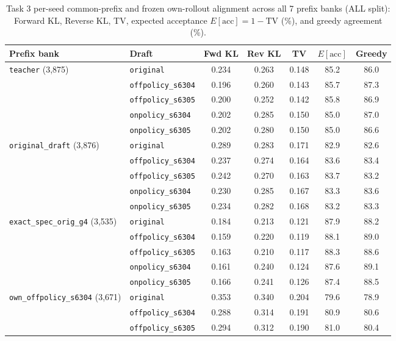 \documentclass{article}
\begin{document}
\begin{table}[H]
\centering\footnotesize
\caption{Task 3 per-seed common-prefix and frozen own-rollout alignment across all 7 prefix banks (ALL split): Forward KL, Reverse KL, TV, expected acceptance $E[\text{acc}]=1-\text{TV}$ (\%), and greedy agreement (\%).}
\label{tab:t3align}
\begin{tabular}{llccccc}
\toprule
Prefix bank & Draft & Fwd KL & Rev KL & TV & $E[\text{acc}]$ & Greedy \\
\midrule
\texttt{teacher} (3,875) & \texttt{original} & 0.234 & 0.263 & 0.148 & 85.2 & 86.0 \\
 & \texttt{offpolicy\_s6304} & 0.196 & 0.260 & 0.143 & 85.7 & 87.3 \\
 & \texttt{offpolicy\_s6305} & 0.200 & 0.252 & 0.142 & 85.8 & 86.9 \\
 & \texttt{onpolicy\_s6304} & 0.202 & 0.285 & 0.150 & 85.0 & 87.0 \\
 & \texttt{onpolicy\_s6305} & 0.202 & 0.280 & 0.150 & 85.0 & 86.6 \\
\midrule
\texttt{original\_draft} (3,876) & \texttt{original} & 0.289 & 0.283 & 0.171 & 82.9 & 82.6 \\
 & \texttt{offpolicy\_s6304} & 0.237 & 0.274 & 0.164 & 83.6 & 83.4 \\
 & \texttt{offpolicy\_s6305} & 0.242 & 0.270 & 0.163 & 83.7 & 83.2 \\
 & \texttt{onpolicy\_s6304} & 0.230 & 0.285 & 0.167 & 83.3 & 83.6 \\
 & \texttt{onpolicy\_s6305} & 0.234 & 0.282 & 0.168 & 83.2 & 83.3 \\
\midrule
\texttt{exact\_spec\_orig\_g4} (3,535) & \texttt{original} & 0.184 & 0.213 & 0.121 & 87.9 & 88.2 \\
 & \texttt{offpolicy\_s6304} & 0.159 & 0.220 & 0.119 & 88.1 & 89.0 \\
 & \texttt{offpolicy\_s6305} & 0.163 & 0.210 & 0.117 & 88.3 & 88.6 \\
 & \texttt{onpolicy\_s6304} & 0.161 & 0.240 & 0.124 & 87.6 & 89.1 \\
 & \texttt{onpolicy\_s6305} & 0.166 & 0.241 & 0.126 & 87.4 & 88.5 \\
\midrule
\texttt{own\_offpolicy\_s6304} (3,671) & \texttt{original} & 0.353 & 0.340 & 0.204 & 79.6 & 78.9 \\
 & \texttt{offpolicy\_s6304} & 0.288 & 0.314 & 0.191 & 80.9 & 80.6 \\
 & \texttt{offpolicy\_s6305} & 0.294 & 0.312 & 0.190 & 81.0 & 80.4 \\

\end{tabular}
\end{table}
\end{document}
